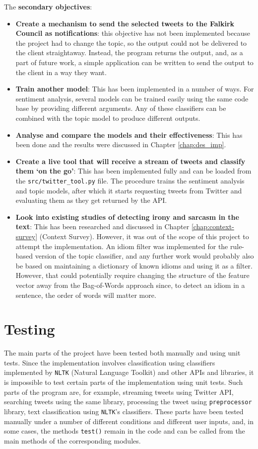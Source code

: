 The \textbf{secondary objectives}:
\begin{itemize}
    \item \textbf{Create a mechanism to send the selected tweets to the Falkirk Council as notifications}: this objective has not been implemented because the project had to change the topic, so the output could not be delivered to the client straightaway. Instead, the program returns the output, and, as a part of future work, a simple application can be written to send the output to the client in a way they want.
    \item \textbf{Train another model}: This has been implemented in a number of ways. For sentiment analysis, several models can be trained easily using the same code base by providing different arguments. Any of these classifiers can be combined with the topic model to produce different outputs. 
    \item \textbf{Analyse and compare the models and their effectiveness}: This has been done and the results were discussed in Chapter \ref{chap:des_imp}.
    \item \textbf{Create a live tool that will receive a stream of tweets and classify them `on the go'}: This has been implemented fully and can be loaded from the \texttt{src/twitter\_tool.py} file. The procedure trains the sentiment analysis and topic models, after which it starts requesting tweets from Twitter and evaluating them as they get returned by the API.
    \item \textbf{Look into existing studies of detecting irony and sarcasm in the text}: This has been researched and discussed in Chapter \ref{chap:context-survey} (Context Survey). However, it was out of the scope of this project to attempt the implementation. An idiom filter was implemented for the rule-based version of the topic classifier, and any further work would probably also be based on maintaining a dictionary of known idioms and using it as a filter. However, that could potentially require changing the structure of the feature vector away from the Bag-of-Words approach since, to detect an idiom in a sentence, the order of words will matter more.  
\end{itemize}

\section{Testing}
\label{sec:testing}

The main parts of the project have been tested both manually and using unit tests. 
Since the implementation involves classification using classifiers implemented by \texttt{NLTK} (Natural Language Toolkit) and other APIs and libraries, it is impossible to test certain parts of the implementation using unit tests. Such parts of the program are, for example, streaming tweets using Twitter API, searching tweets using the same library, processing the tweet using \texttt{preprocessor} library, text classification using \texttt{NLTK}'s classifiers. These parts have been tested manually under a number of different conditions and different user inputs, and, in some cases, the methods \texttt{test()} remain in the code and can be called from the main methods of the corresponding modules.

